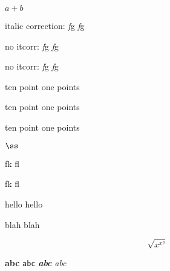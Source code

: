 \documentclass[11pt]{article}
\begin{document}
$a+b$

italic correction: \textit{f}g {\itshape f}g

\def\nocorrlist{g}
no itcorr: \textit{f}g {\itshape f}g

\def\nocorrlist{}
no itcorr: \textit{f\nocorr}g {\itshape f}g

{\fontsize{10.1pt}{10.1pt}\selectfont ten point one points}

{\fontsize{10.1pt}{10.1pt}\selectfont ten point one points}

{\fontsize{10.1pt}{10.1pt}\selectfont ten point one points}

$\ss$ %

fk fl

\selectfont

fk fl

hello \selectfont hello

blah \fontsize{18.7}{0}\selectfont blah

\[
\sqrt{x^{x^y}}
\]

\textbf{abc} \texttt{abc} \textbf{\emph{abc}} \emph{\textsf{abc}}
\end{document}
